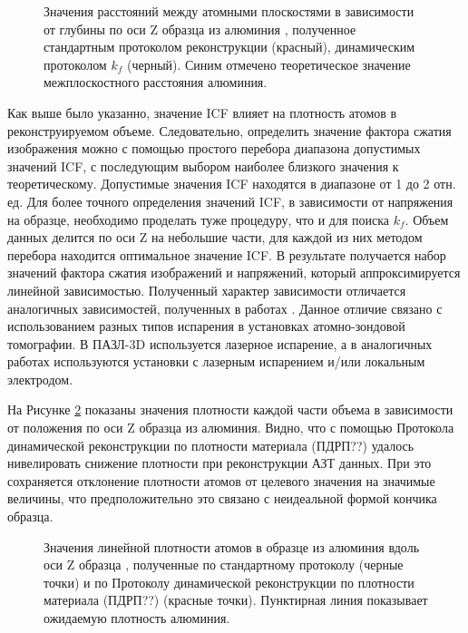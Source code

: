 \begin{figure}[htb]
	\caption{Значения расстояний между атомными плоскостями в зависимости от глубины по оси Z образца из алюминия \cite{scbibDensity}, полученное стандартным протоколом реконструкции (красный), динамическим протоколом $k_f$ (черный). Синим отмечено теоретическое значение межплоскостного расстояния алюминия.}
	\label{fig:p3_PlanesDistance_depth}
\end{figure}

Как выше было указанно, значение ICF влияет на плотность атомов в реконструируемом объеме. Следовательно, определить значение фактора сжатия изображения можно с помощью простого перебора диапазона допустимых значений ICF, с последующим выбором наиболее близкого значения к теоретическому. Допустимые значения ICF находятся в диапазоне от 1 до 2 отн. ед. Для более точного определения значений ICF, в зависимости от напряжения на образце, необходимо проделать туже процедуру, что и для поиска $k_f$. Объем данных делится по оси Z на небольшие части, для каждой из них методом перебора находится оптимальное значение ICF. В результате получается набор значений фактора сжатия изображений и напряжений, который аппроксимируется линейной зависимостью. Полученный характер зависимости отличается аналогичных зависимостей, полученных в работах \cite{Hatzoglou19, Gault11_Loi}. Данное отличие связано с использованием разных типов испарения в установках атомно-зондовой томографии. В ПАЗЛ-3D используется лазерное испарение, а в аналогичных работах используются установки с лазерным испарением и/или локальным электродом.

На Рисунке \cref{fig:p3_Density_vs_depth} показаны значения плотности каждой части объема в зависимости от положения по оси Z образца из алюминия. Видно, что с помощью Протокола динамической реконструкции по плотности материала (ПДРП??) удалось нивелировать снижение плотности при реконструкции АЗТ данных. При это сохраняется отклонение плотности атомов от целевого значения на значимые величины, что предположительно это связано с неидеальной формой кончика образца.

\begin{figure}[htb]
	\caption{Значения линейной плотности атомов в образце из алюминия вдоль оси Z образца \cite{scbibDensity}, полученные по стандартному протоколу (черные точки) и по Протоколу динамической реконструкции по плотности материала (ПДРП??) (красные точки). Пунктирная линия показывает ожидаемую плотность алюминия.}
	\label{fig:p3_Density_vs_depth}
\end{figure}

